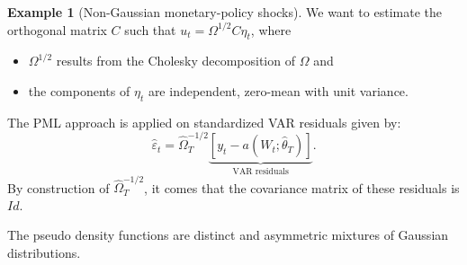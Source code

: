 \documentclass[
  11pt,
]{book}
\providecommand{\tightlist}{%
  \setlength{\itemsep}{0pt}\setlength{\parskip}{0pt}}
\theoremstyle{definition}
\theoremstyle{definition}
\newtheorem{example}{Example}[chapter]
\theoremstyle{definition}
\theoremstyle{definition}
\theoremstyle{remark}
\begin{document}
\begin{example}[Non-Gaussian monetary-policy shocks]
We want to estimate the orthogonal matrix \(C\) such that \(u_t=\Omega^{1/2}C \eta_t\), where

\begin{itemize}
\tightlist
\item
  \(\Omega^{1/2}\) results from the Cholesky decomposition of \(\Omega\) and
\item
  the components of \(\eta_t\) are independent, zero-mean with unit variance.
\end{itemize}

The PML approach is applied on standardized VAR residuals given by:
\[
\hat\varepsilon_t = \hat\Omega^{-1/2}_T\underbrace{[y_t - a(W_t;\hat\theta_T)]}_{\mbox{VAR residuals}}.
\]
By construction of \(\hat\Omega^{-1/2}_T\), it comes that the covariance matrix of these residuals is \(Id\).

The pseudo density functions are distinct and asymmetric mixtures of Gaussian distributions.


\end{example}
\end{document}
